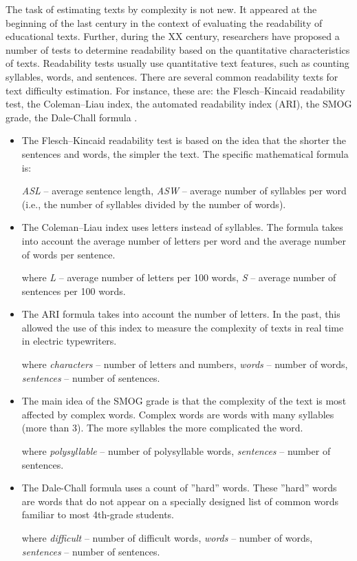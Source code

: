 \documentclass[runningheads]{llncs}
\begin{document}
The task of estimating texts by complexity is not new. It appeared at the beginning of the last century in the context of evaluating the readability of educational texts. Further, during the XX century, researchers have proposed a number of tests to determine readability based on the quantitative characteristics of texts. Readability tests usually use quantitative text features, such as counting syllables, words, and sentences. There are several common readability texts for text difficulty estimation. For instance, these are: the Flesch–Kincaid readability test, the Coleman–Liau index, the automated readability index (ARI), the SMOG grade, the Dale-Chall formula \cite{Crossley,Didegan}. 

\begin{itemize}
    \item The Flesch–Kincaid readability test is based on the idea that the shorter the sentences and words, the simpler the text. The specific mathematical formula is: 
    
    \textit{ASL} -- average sentence length,
    \textit{ASW} -- average number of syllables per word (i.e., the number of syllables divided by the number of words).
    \item The Coleman–Liau index uses letters instead of syllables. The formula takes into account the average number of letters per word and the average number of words per sentence.
     
    where \textit{L} -- average number of letters per 100 words,
    \textit{S} -- average number of sentences per 100 words.
    \item The ARI formula takes into account the number of letters. In the past, this allowed the use of this index to measure the complexity of texts in real time in electric typewriters.
     
    where \textit{characters} -- number of letters and numbers,
    \textit{words} -- number of words,
    \textit{sentences} -- number of sentences.
    \item The main idea of the SMOG grade is that the complexity of the text is most affected by complex words. Complex words are words with many syllables (more than 3). The more syllables the more complicated the word.
    
    where \textit{polysyllable} -- number of polysyllable words,
    \textit{sentences} -- number of sentences.
    \item The Dale-Chall formula uses a count of ''hard'' words. These ''hard'' words are words that do not appear on a specially designed list of common words familiar to most 4th-grade students.
    
    where \textit{difficult} -- number of difficult words,
    \textit{words} -- number of words,
    \textit{sentences} -- number of sentences.
\end{itemize}
\end{document}
